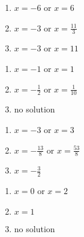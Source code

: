 {\begin{multicols}{3}
\begin{enumerate}
\item  $x = -6$ or $x=6$

\item $x = -3$ or $x= \frac{11}{3}$

\item $x = -3$ or $x= 11$

\setcounter{HW}{\value{enumi}}
\end{enumerate}
\end{multicols}

\begin{multicols}{3}
\begin{enumerate}
\setcounter{enumi}{\value{HW}}

\item  $x = -1$ or $x= 1$

\item $x=-\frac{1}{2}$ or $x= \frac{1}{10}$

\item no solution

\setcounter{HW}{\value{enumi}}
\end{enumerate}
\end{multicols}

\begin{multicols}{3}
\begin{enumerate}
\setcounter{enumi}{\value{HW}}

\item  $x=-3$ or $x= 3$

\item $x = -\frac{13}{8}$ or $x= \frac{53}{8}$

\item $x=-\frac{3}{2}$

\setcounter{HW}{\value{enumi}}
\end{enumerate}
\end{multicols}


\begin{multicols}{3}
\begin{enumerate}
\setcounter{enumi}{\value{HW}}

\item  $x=0$ or $x= 2$

\item  $x=1$

\item  no solution

\setcounter{HW}{\value{enumi}}
\end{enumerate}
\end{multicols}


}
